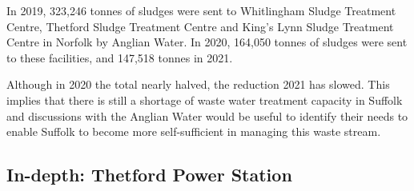 \documentclass[
]{article}
\begin{document}
In 2019, 323,246 tonnes of sludges were sent to Whitlingham Sludge
Treatment Centre, Thetford Sludge Treatment Centre and King's Lynn
Sludge Treatment Centre in Norfolk by Anglian Water. In 2020, 164,050
tonnes of sludges were sent to these facilities, and 147,518 tonnes in
2021.

Although in 2020 the total nearly halved, the reduction 2021 has slowed.
This implies that there is still a shortage of waste water treatment
capacity in Suffolk and discussions with the Anglian Water would be
useful to identify their needs to enable Suffolk to become more
self-sufficient in managing this waste stream.

\hypertarget{in-depth-thetford-power-station}{%
\subsection{In-depth: Thetford Power
Station}\label{in-depth-thetford-power-station}}

\providecommand{\docline}[3]{\noalign{\global\setlength{\arrayrulewidth}{#1}}\arrayrulecolor[HTML]{#2}\cline{#3}}

\setlength{\tabcolsep}{0pt}

\renewcommand*{\arraystretch}{1.5}
\end{document}
